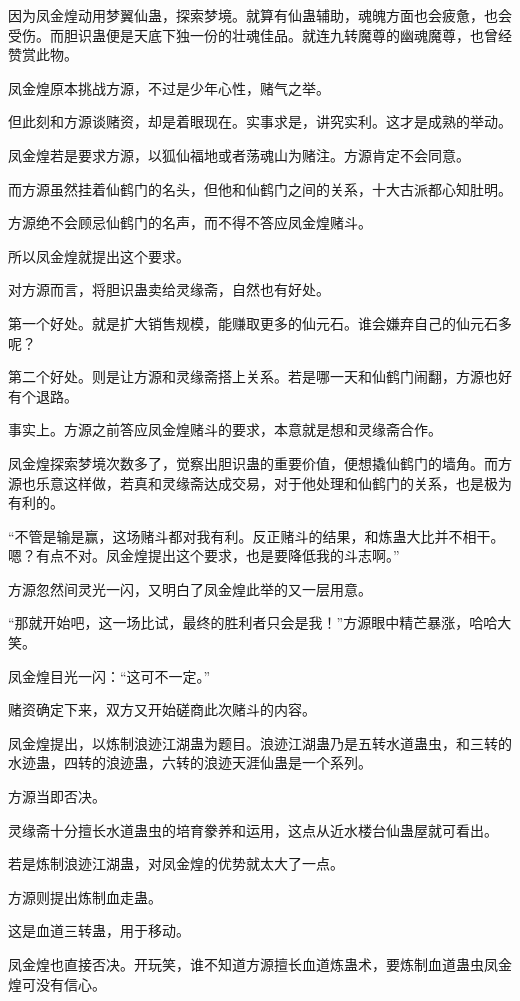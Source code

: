 \begin{this_body}
因为凤金煌动用梦翼仙蛊，探索梦境。就算有仙蛊辅助，魂魄方面也会疲惫，也会受伤。而胆识蛊便是天底下独一份的壮魂佳品。就连九转魔尊的幽魂魔尊，也曾经赞赏此物。

凤金煌原本挑战方源，不过是少年心性，赌气之举。

但此刻和方源谈赌资，却是着眼现在。实事求是，讲究实利。这才是成熟的举动。

凤金煌若是要求方源，以狐仙福地或者荡魂山为赌注。方源肯定不会同意。

而方源虽然挂着仙鹤门的名头，但他和仙鹤门之间的关系，十大古派都心知肚明。

方源绝不会顾忌仙鹤门的名声，而不得不答应凤金煌赌斗。

所以凤金煌就提出这个要求。

对方源而言，将胆识蛊卖给灵缘斋，自然也有好处。

第一个好处。就是扩大销售规模，能赚取更多的仙元石。谁会嫌弃自己的仙元石多呢？

第二个好处。则是让方源和灵缘斋搭上关系。若是哪一天和仙鹤门闹翻，方源也好有个退路。

事实上。方源之前答应凤金煌赌斗的要求，本意就是想和灵缘斋合作。

凤金煌探索梦境次数多了，觉察出胆识蛊的重要价值，便想撬仙鹤门的墙角。而方源也乐意这样做，若真和灵缘斋达成交易，对于他处理和仙鹤门的关系，也是极为有利的。

“不管是输是赢，这场赌斗都对我有利。反正赌斗的结果，和炼蛊大比并不相干。嗯？有点不对。凤金煌提出这个要求，也是要降低我的斗志啊。”

方源忽然间灵光一闪，又明白了凤金煌此举的又一层用意。

“那就开始吧，这一场比试，最终的胜利者只会是我！”方源眼中精芒暴涨，哈哈大笑。

凤金煌目光一闪：“这可不一定。”

赌资确定下来，双方又开始磋商此次赌斗的内容。

凤金煌提出，以炼制浪迹江湖蛊为题目。浪迹江湖蛊乃是五转水道蛊虫，和三转的水迹蛊，四转的浪迹蛊，六转的浪迹天涯仙蛊是一个系列。

方源当即否决。

灵缘斋十分擅长水道蛊虫的培育豢养和运用，这点从近水楼台仙蛊屋就可看出。

若是炼制浪迹江湖蛊，对凤金煌的优势就太大了一点。

方源则提出炼制血走蛊。

这是血道三转蛊，用于移动。

凤金煌也直接否决。开玩笑，谁不知道方源擅长血道炼蛊术，要炼制血道蛊虫凤金煌可没有信心。


\end{this_body}
